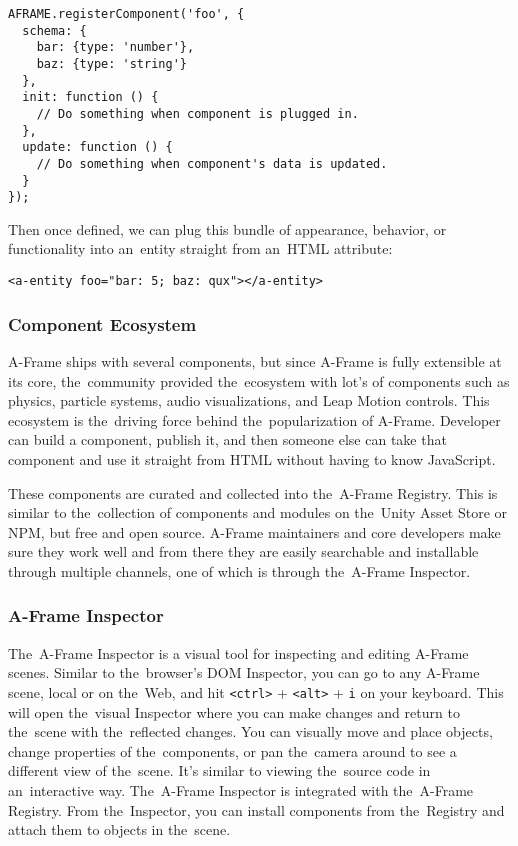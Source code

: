 \begin{lstlisting}
AFRAME.registerComponent('foo', {
  schema: {
    bar: {type: 'number'},
    baz: {type: 'string'}
  },
  init: function () {
    // Do something when component is plugged in.
  },
  update: function () {
    // Do something when component's data is updated.
  }
});
\end{lstlisting}

\newpage
Then once defined, we can plug this bundle of appearance, behavior, or functionality into an~entity straight from an~HTML attribute:

\begin{lstlisting}
<a-entity foo="bar: 5; baz: qux"></a-entity>
\end{lstlisting}

\subsubsection{Component Ecosystem}
A-Frame ships with several components, but since A-Frame is fully extensible at its core, the~community provided the~ecosystem with lot's of components such as physics, particle systems, audio visualizations, and Leap Motion controls. This ecosystem is the~driving force behind the~popularization of A-Frame. Developer can build a component, publish it, and then someone else can take that component and use it straight from HTML without having to know JavaScript. \cite{aframe-intro}

These components are curated and collected into the~A-Frame Registry. This is similar to the~collection of components and modules on the~Unity Asset Store or NPM, but free and open source. A-Frame maintainers and core developers make sure they work well and from there they are easily searchable and installable through multiple channels, one of which is through the~A-Frame Inspector. \cite{aframe-intro}

\subsubsection{A-Frame Inspector}
The~A-Frame Inspector is a visual tool for inspecting and editing A-Frame scenes. Similar to the~browser’s DOM Inspector, you can go to any A-Frame scene, local or on the~Web, and hit \texttt{<ctrl>} + \texttt{<alt>} + \texttt{i} on your keyboard. This will open the~visual Inspector where you can make changes and return to the~scene with the~reflected changes. You can visually move and place objects, change properties of the~components, or pan the~camera around to see a different view of the~scene. It’s similar to viewing the~source code in an~interactive way. The~A-Frame Inspector is integrated with the~A-Frame Registry. From the~Inspector, you can install components from the~Registry and attach them to objects in the~scene. \cite{aframe-intro}

